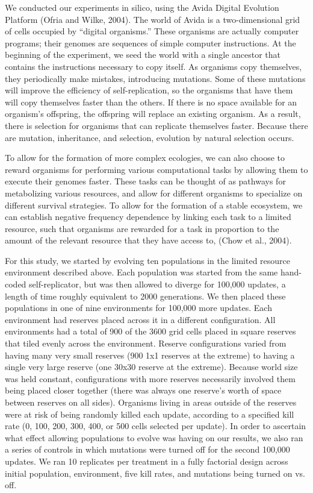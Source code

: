 \documentclass[letterpaper]{article}
\begin{document}
We conducted our experiments in silico, using the Avida Digital Evolution Platform (Ofria and Wilke, 2004). The world of Avida is a two-dimensional grid of cells occupied by “digital organisms.” These organisms are actually computer programs; their genomes are sequences of simple computer instructions. At the beginning of the experiment, we seed the world with a single ancestor that contains the instructions necessary to copy itself. As organisms copy themselves, they periodically make mistakes, introducing mutations. Some of these mutations will improve the efficiency of self-replication, so the organisms that have them will copy themselves faster than the others. If there is no space available for an organism’s offspring, the offspring will replace an existing organism. As a result, there is selection for organisms that can replicate themselves faster. Because there are mutation, inheritance, and selection, evolution by natural selection occurs. 

	To allow for the formation of more complex ecologies, we can also choose to reward organisms for performing various computational tasks by allowing them to execute their genomes faster. These tasks can be thought of as pathways for metabolizing various resources, and allow for different organisms to specialize on different survival strategies. To allow for the formation of a stable ecosystem, we can establish negative frequency dependence by linking each task to a limited resource, such that organisms are rewarded for a task in proportion to the amount of the relevant resource that they have access to, (Chow et al., 2004). 
    
	For this study, we started by evolving ten populations in the limited resource environment described above. Each population was started from the same hand-coded self-replicator, but was then allowed to diverge for 100,000 updates, a length of time roughly equivalent to 2000 generations. We then placed these populations in one of nine environments for 100,000 more updates. Each environment had reserves placed across it in a different configuration. All environments had a total of 900 of the 3600 grid cells placed in square reserves that tiled evenly across the environment. Reserve configurations varied from having many very small reserves (900 1x1 reserves at the extreme) to having a single very large reserve (one 30x30 reserve at the extreme). Because world size was held constant, configurations with more reserves necessarily involved them being placed closer together (there was always one reserve's worth of space between reserves on all sides). Organisms living in areas outside of the reserves were at risk of being randomly killed each update, according to a specified kill rate (0, 100, 200, 300, 400, or 500 cells selected per update). In order to ascertain what effect allowing populations to evolve was having on our results, we also ran a series of controls in which mutations were turned off for the second 100,000 updates. We ran 10 replicates per treatment in a fully factorial design across initial population, environment, five kill rates, and mutations being turned on vs. off.
    
\end{document}

